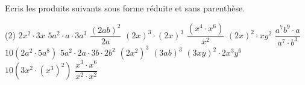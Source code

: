 %
%
Ecris les produits suivants sous forme réduite et sans parenthèse.
	\begin{tasks} (2)
		\task $2x^2\cdot 3x$
		\task $5a^2\cdot a\cdot 3a^3$
		\task $\dfrac{(2ab)^2}{2a}$
		\task $(2x)^3\cdot (2x)^3$
		\task $\dfrac{\left(x^4\cdot x^6\right)}{x^2}$
		\task $(2x)^2\cdot xy^2$
		\task $\dfrac{a^7b^9\cdot a}{a^7\cdot b^3}$
		\task $10(2a^2\cdot 5a^8)$
		\task $5a^2\cdot 2a\cdot 3b\cdot 2b^2$
		\task $(2x^2)^3$
		\task $(3ab)^3$
		\task $(3xy)^2\cdot 2x^3y^6$
		\task $10\left(3x^2\cdot (x^3)^2\right)$
		\task $\dfrac{x^3\cdot x^6}{x^2\cdot x^2}$
	\end{tasks}
